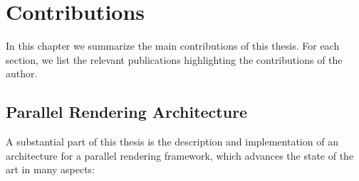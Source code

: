 \chapter{Contributions}

In this chapter we summarize the main contributions of this thesis. For each
section, we list the relevant publications highlighting the contributions of the
author.

\section{Parallel Rendering Architecture}

A substantial part of this thesis is the description and implementation of an
architecture for a parallel rendering framework, which advances the state of the
art in many aspects:

